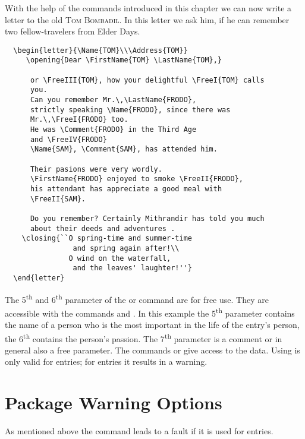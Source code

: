 With the help of the commands introduced in this chapter
we can now write a letter to the old \textsc{Tom Bombadil}.
In this letter we ask him, if he can remember two
fellow-travelers from Elder Days.
\begin{lstlisting}
  \begin{letter}{\Name{TOM}\\\Address{TOM}}
     \opening{Dear \FirstName{TOM} \LastName{TOM},}
     
      or \FreeIII{TOM}, how your delightful \FreeI{TOM} calls
      you.
      Can you remember Mr.\,\LastName{FRODO},
      strictly speaking \Name{FRODO}, since there was
      Mr.\,\FreeI{FRODO} too.
      He was \Comment{FRODO} in the Third Age
      and \FreeIV{FRODO}
      \Name{SAM}, \Comment{SAM}, has attended him.
      
      Their pasions were very wordly.
      \FirstName{FRODO} enjoyed to smoke \FreeII{FRODO}, 
      his attendant has appreciate a good meal with
      \FreeII{SAM}.

      Do you remember? Certainly Mithrandir has told you much
      about their deeds and adventures .
    \closing{``O spring-time and summer-time
                and spring again after!\\
               O wind on the waterfall,
                and the leaves' laughter!''}
  \end{letter}
\end{lstlisting}
The 5\textsuperscript{th} and 6\textsuperscript{th} parameter of the
 or  command are for free use.  They are
accessible with the commands  and .  In this
example the 5\textsuperscript{th} parameter contains the name of a person who
is the most important in the life of the entry's person, the
6\textsuperscript{th} contains the person's passion.  The
7\textsuperscript{th} parameter is a comment or in general also a free
parameter. The commands  or  give access to the
data. Using  is only valid for  entries; for
 entries it results in a warning.

\section{Package Warning Options}

As mentioned above the command  leads
to a fault if it is used for  entries.

